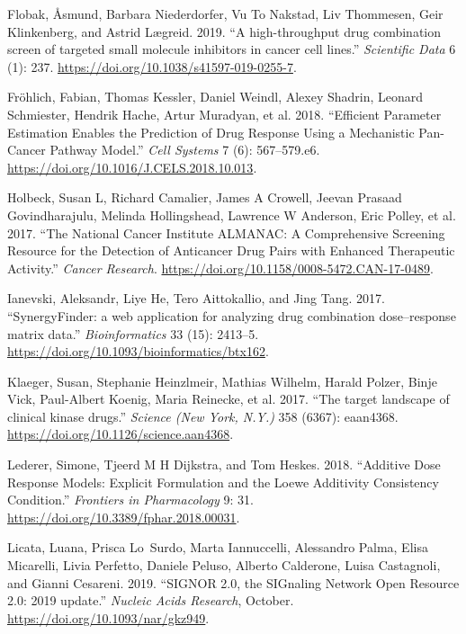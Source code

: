 \documentclass[
  12pt,
]{book}
\begin{document}
\leavevmode\hypertarget{ref-Flobak2019}{}%
Flobak, Åsmund, Barbara Niederdorfer, Vu To Nakstad, Liv Thommesen, Geir Klinkenberg, and Astrid Lægreid. 2019. ``A high-throughput drug combination screen of targeted small molecule inhibitors in cancer cell lines.'' \emph{Scientific Data} 6 (1): 237. \url{https://doi.org/10.1038/s41597-019-0255-7}.

\leavevmode\hypertarget{ref-Frohlich2018}{}%
Fröhlich, Fabian, Thomas Kessler, Daniel Weindl, Alexey Shadrin, Leonard Schmiester, Hendrik Hache, Artur Muradyan, et al. 2018. ``Efficient Parameter Estimation Enables the Prediction of Drug Response Using a Mechanistic Pan-Cancer Pathway Model.'' \emph{Cell Systems} 7 (6): 567--579.e6. \url{https://doi.org/10.1016/J.CELS.2018.10.013}.

\leavevmode\hypertarget{ref-Holbeck2017}{}%
Holbeck, Susan L, Richard Camalier, James A Crowell, Jeevan Prasaad Govindharajulu, Melinda Hollingshead, Lawrence W Anderson, Eric Polley, et al. 2017. ``The National Cancer Institute ALMANAC: A Comprehensive Screening Resource for the Detection of Anticancer Drug Pairs with Enhanced Therapeutic Activity.'' \emph{Cancer Research}. \url{https://doi.org/10.1158/0008-5472.CAN-17-0489}.

\leavevmode\hypertarget{ref-Ianevski2017}{}%
Ianevski, Aleksandr, Liye He, Tero Aittokallio, and Jing Tang. 2017. ``SynergyFinder: a web application for analyzing drug combination dose--response matrix data.'' \emph{Bioinformatics} 33 (15): 2413--5. \url{https://doi.org/10.1093/bioinformatics/btx162}.

\leavevmode\hypertarget{ref-Klaeger2017}{}%
Klaeger, Susan, Stephanie Heinzlmeir, Mathias Wilhelm, Harald Polzer, Binje Vick, Paul-Albert Koenig, Maria Reinecke, et al. 2017. ``The target landscape of clinical kinase drugs.'' \emph{Science (New York, N.Y.)} 358 (6367): eaan4368. \url{https://doi.org/10.1126/science.aan4368}.

\leavevmode\hypertarget{ref-Lederer2018}{}%
Lederer, Simone, Tjeerd M H Dijkstra, and Tom Heskes. 2018. ``Additive Dose Response Models: Explicit Formulation and the Loewe Additivity Consistency Condition.'' \emph{Frontiers in Pharmacology} 9: 31. \url{https://doi.org/10.3389/fphar.2018.00031}.

\leavevmode\hypertarget{ref-Licata2019}{}%
Licata, Luana, Prisca Lo~Surdo, Marta Iannuccelli, Alessandro Palma, Elisa Micarelli, Livia Perfetto, Daniele Peluso, Alberto Calderone, Luisa Castagnoli, and Gianni Cesareni. 2019. ``SIGNOR 2.0, the SIGnaling Network Open Resource 2.0: 2019 update.'' \emph{Nucleic Acids Research}, October. \url{https://doi.org/10.1093/nar/gkz949}.
\end{document}
